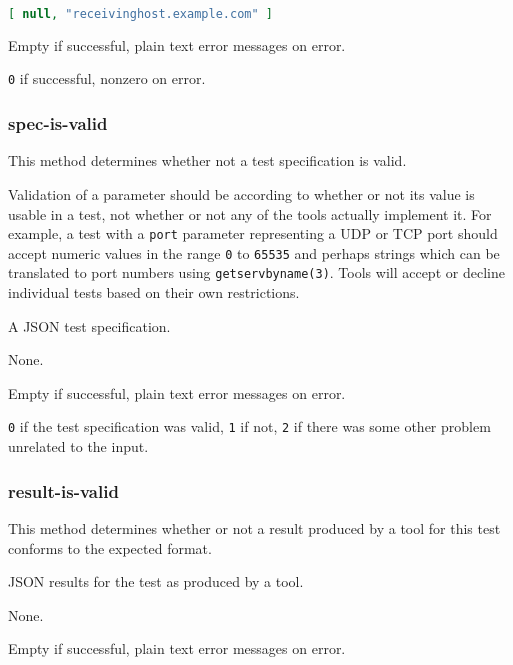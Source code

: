 \documentclass[10pt,titlepage]{article}
\begin{document}
\example
\begin{lstlisting}[language=json,firstnumber=1]
[ null, "receivinghost.example.com" ]
\end{lstlisting}

 Empty if successful, plain text error
messages on error.

 {\tt 0} if successful, nonzero on error.



\subsubsection{spec-is-valid}
This method determines whether not a test specification is valid.

Validation of a parameter should be according to whether or not its
value is usable in a test, not whether or not any of the tools
actually implement it.  For example, a test with a {\tt port}
parameter representing a UDP or TCP port should accept numeric values
in the range {\tt 0} to {\tt 65535} and perhaps strings which can be
translated to port numbers using {\tt getservbyname(3)}.  Tools will
accept or decline individual tests based on their own restrictions.

 A JSON test specification.

 None.

 Empty if successful, plain text error
messages on error.

 {\tt 0} if the test specification was valid,
            {\tt 1} if not, {\tt 2} if there was some other problem
            unrelated to the input.



\subsubsection{result-is-valid}
This method determines whether or not a result produced by a tool for
this test conforms to the expected format.  

 JSON results for the test as produced by
a tool.

 None.

 Empty if successful, plain text error
messages on error.
\end{document}
